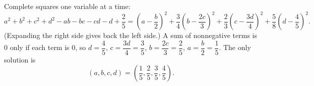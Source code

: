 Complete squares one variable at a time:
\[
a^2+b^2+c^2+d^2-ab-bc-cd-d+\dfrac{2}{5}=\left(a-\dfrac {b}{2}\right)^2+\dfrac{3}{4}\left(b-\dfrac{2c}{3}\right)^2+\dfrac{2}{3}\left(c-\dfrac{3d}{4}\right)^2+\dfrac{5}{8}\left(d-\dfrac{4}{5}\right)^2 .
\]
(Expanding the right side gives back the left side.) A sum of nonnegative terms is $0$ only if each term is $0$, so $d=\dfrac{4}{5}$, $c=\dfrac{3d}{4}=\dfrac{3}{5}$, $b=\dfrac{2c}{3}=\dfrac{2}{5}$, $a=\dfrac {b}{2}=\dfrac{1}{5}$. The only solution is
\[
\boxed{(a,b,c,d)=\left(\dfrac{1}{5},\dfrac{2}{5},\dfrac{3}{5},\dfrac{4}{5}\right)}.
\]
